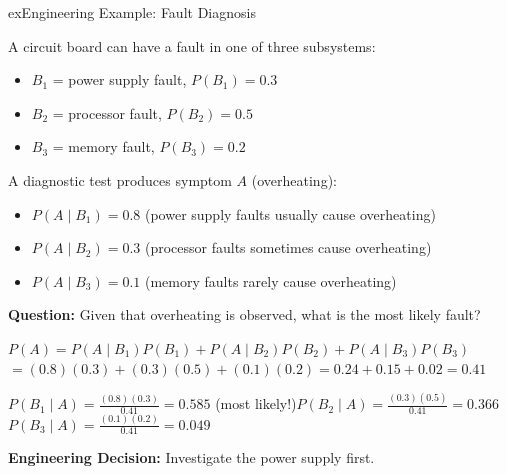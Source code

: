 \begin{PSbox}[unbreakable]{ex}{Engineering Example: Fault Diagnosis}

A circuit board can have a fault in one of three subsystems:

\begin{itemize}
\tightlist
\item
  $B_{1}$ = power supply fault, $P(B_{1}) = 0.3$
\item
  $B_{2}$ = processor fault, $P(B_{2}) = 0.5$
\item
  $B_{3}$ = memory fault, $P(B_{3}) = 0.2$
\end{itemize}

A diagnostic test produces symptom $A$ (overheating):

\begin{itemize}
\tightlist
\item
  $P(A \mid B_{1}) = 0.8$ (power supply faults usually cause overheating)
\item
  $P(A \mid B_{2}) = 0.3$ (processor faults sometimes cause overheating)
\item
  $P(A \mid B_{3}) = 0.1$ (memory faults rarely cause overheating)
\end{itemize}

\textbf{Question:} Given that overheating is observed, what is the most likely fault?

\PSsolution{} 

$P(A) = P(A \mid B_{1})P(B_{1}) + P(A \mid B_{2})P(B_{2}) + P(A \mid B_{3})P(B_{3})$\PSbr{}$= (0.8)(0.3) + (0.3)(0.5) + (0.1)(0.2)$\PSbr{}$= 0.24 + 0.15 + 0.02 = 0.41$

$P(B_{1} \mid A) = \frac{(0.8)(0.3)}{0.41} = 0.585$ (most likely!)\PSbr{}$\displaystyle P(B_{2} \mid A) = \frac{(0.3)(0.5)}{0.41} = 0.366$\PSbr{}$\displaystyle P(B_{3} \mid A) = \frac{(0.1)(0.2)}{0.41} = 0.049$

\textbf{Engineering Decision:} Investigate the power supply first.

\end{PSbox}

